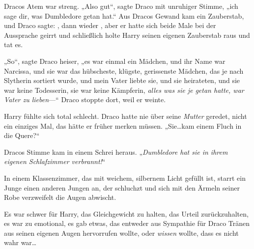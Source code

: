 Dracos Atem war streng. „Also gut“, sagte Draco mit unruhiger Stimme, „ich sage dir, was Dumbledore getan hat.“ Aus Dracos Gewand kam ein Zauberstab, und Draco sagte: , dann wieder , aber er hatte sich beide Male bei der Aussprache geirrt und schließlich holte Harry seinen eigenen Zauberstab raus und tat es.

„So“, sagte Draco heiser, „es war einmal ein Mädchen, und ihr Name war Narcissa, und sie war das hübscheste, klügste, gerissenste Mädchen, das je nach Slytherin sortiert wurde, und mein Vater liebte sie, und sie heirateten, und sie war keine Todesserin, sie war keine Kämpferin, \emph{alles was sie je getan hatte, war Vater zu lieben}—“ Draco stoppte dort, weil er weinte.

Harry fühlte sich total schlecht. Draco hatte nie über seine \emph{Mutter} geredet, nicht ein einziges Mal, das hätte er früher merken müssen. „Sie…kam einem Fluch in die Quere?“

Dracos Stimme kam in einem Schrei heraus. „\emph{Dumbledore hat sie in ihrem eigenen Schlafzimmer verbrannt!}“

\later

In einem Klassenzimmer, das mit weichem, silbernem Licht gefüllt ist, starrt ein Junge einen anderen Jungen an, der schluchzt und sich mit den Ärmeln seiner Robe verzweifelt die Augen abwischt.

Es war schwer für Harry, das Gleichgewicht zu halten, das Urteil zurückzuhalten, es war zu emotional, es gab etwas, das entweder aus Sympathie für Draco Tränen aus seinen eigenen Augen hervorrufen wollte, oder \emph{wissen} wollte, dass es nicht wahr war…

